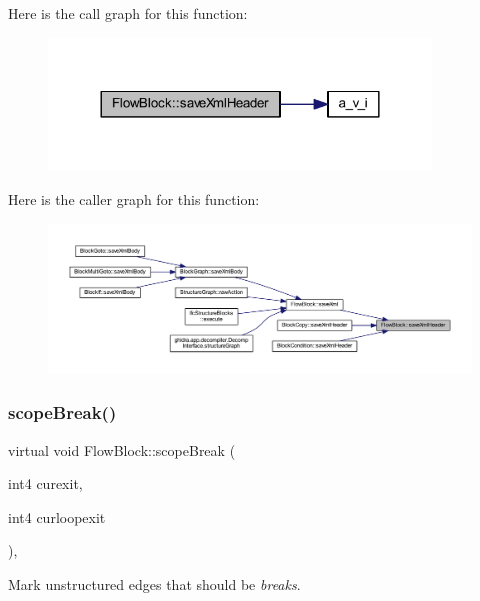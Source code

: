 Here is the call graph for this function\+:
\nopagebreak
\begin{figure}[H]
\begin{center}
\leavevmode
\includegraphics[width=288pt]{class_flow_block_a6cf95f66e3f6940a8342b3e6fdfc5ca2_cgraph}
\end{center}
\end{figure}
Here is the caller graph for this function\+:
\nopagebreak
\begin{figure}[H]
\begin{center}
\leavevmode
\includegraphics[width=350pt]{class_flow_block_a6cf95f66e3f6940a8342b3e6fdfc5ca2_icgraph}
\end{center}
\end{figure}
\mbox{\label{class_flow_block_a392611cfd24306f58ea6e18371809223}} 
\subsubsection{\texorpdfstring{scopeBreak()}{scopeBreak()}}
{\footnotesize\ttfamily virtual void Flow\+Block\+::scope\+Break (\begin{DoxyParamCaption}\item[{int4}]{curexit,  }\item[{int4}]{curloopexit }\end{DoxyParamCaption})\hspace{0.3cm}{\ttfamily [inline]}, {\ttfamily [virtual]}}



Mark unstructured edges that should be {\itshape breaks}. 



